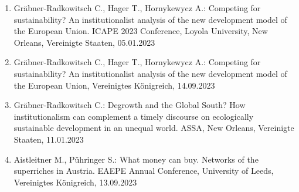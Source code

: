 \begin{enumerate}
	\item Gräbner-Radkowitsch C., Hager T., Hornykewycz A.: Competing for sustainability? An institutionalist analysis of the new development model of the European Union. ICAPE 2023 Conference, Loyola University, New Orleans, Vereinigte Staaten, 05.01.2023
	\item Gräbner-Radkowitsch C., Hager T., Hornykewycz A.: Competing for sustainability? An institutionalist analysis of the new development model of the European Union, Vereinigtes Königreich, 14.09.2023
	\item Gräbner-Radkowitsch C.: Degrowth and the Global South? How institutionalism can complement a timely discourse on ecologically sustainable development in an unequal world. ASSA, New Orleans, Vereinigte Staaten, 11.01.2023
	\item Aistleitner M., Pühringer S.: What money can buy. Networks of the superriches in Austria. EAEPE Annual Conference, University of Leeds, Vereinigtes Königreich, 13.09.2023
\end{enumerate}
